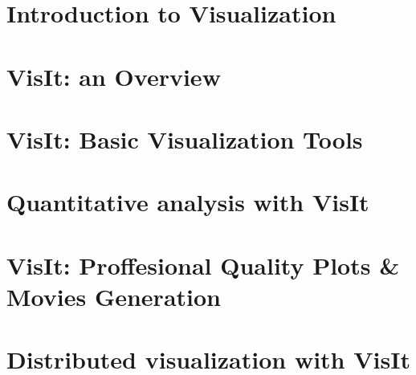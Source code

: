 \documentclass[xcolor=svgnames]{beamer}
\providecommand{\sectionpage}{\Large\centering \bf\mediumblue\insertsection}
\begin{document}
\section{Introduction to Visualization}
\frame{\sectionpage}

\section{VisIt: an Overview}
\frame{\sectionpage}

\section{VisIt: Basic Visualization Tools}
\frame{\sectionpage}

\section{Quantitative analysis with VisIt}
\frame{\sectionpage}

\section{VisIt: Proffesional Quality Plots \& Movies Generation}
\frame{\sectionpage}

\section{Distributed visualization with VisIt}
\frame{\sectionpage}

\end{document}

